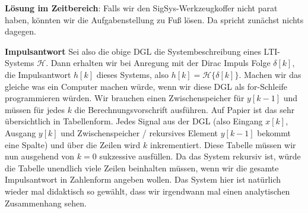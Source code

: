 \begin{Ansatz}
\textbf{Lösung im Zeitbereich}:
Falls wir den SigSys-Werkzeugkoffer nicht parat haben, könnten wir die
Aufgabenstellung zu Fuß lösen. Da spricht zunächst nichts dagegen.

\textbf{Impulsantwort}
Sei also die obige DGL die Systembeschreibung eines LTI-Systems $\mathcal{H}$.
Dann erhalten wir bei Anregung mit der Dirac Impuls Folge $\delta[k]$, die Impulsantwort $h[k]$
dieses Systems, also $h[k] = \mathcal{H}\{\delta[k]\}$. Machen wir das gleiche
was ein Computer machen würde, wenn wir diese DGL als for-Schleife programmieren
würden. Wir brauchen einen Zwischenspeicher für $y[k-1]$ und müssen für jedes
$k$ die Berechnungsvorschrift ausführen. Auf Papier ist das sehr übersichtlich
in Tabellenform. Jedes Signal aus der DGL (also Eingang $x[k]$, Ausgang $y[k]$
und Zwischenspeicher / rekursives Element $y[k-1]$ bekommt eine Spalte) und
über die Zeilen wird $k$ inkrementiert. Diese Tabelle müssen wir nun ausgehend
von $k=0$ sukzessive ausfüllen. Da das System rekursiv ist, würde die Tabelle
unendlich viele Zeilen beinhalten müssen, wenn wir die gesamte Impulsantwort
in Zahlenform angeben wollen. Das System hier ist natürlich wieder mal didaktisch
so gewählt, dass wir irgendwann mal einen analytischen Zusammenhang sehen.


\end{Ansatz}

